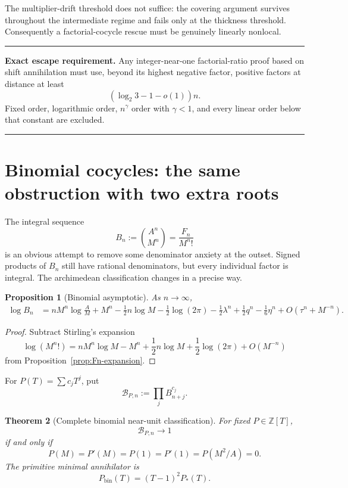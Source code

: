 \documentclass[11pt,oneside]{article}
\newtheorem{theorem}{Theorem}[section]
\newtheorem{proposition}[theorem]{Proposition}
\theoremstyle{definition}
\theoremstyle{remark}
\newcommand{\Z}{\mathbb Z}
\newcommand{\cB}{\mathcal B}
\newenvironment{resultbox}
{\begin{center}\begin{minipage}{0.94\textwidth}\hrule\vspace{0.45em}}
{\vspace{0.35em}\hrule\end{minipage}\end{center}}
\begin{document}
The multiplier-drift threshold does not suffice: the covering argument survives throughout
the intermediate regime and fails only at the thickness threshold.  Consequently a
factorial-cocycle rescue must be genuinely linearly nonlocal.

\begin{resultbox}
\textbf{Exact escape requirement.}
Any integer-near-one factorial-ratio proof based on shift annihilation must use, beyond its
highest negative factor, positive factors at distance at least
\[
 (\log_2 3-1-o(1))n.
\]
Fixed order, logarithmic order, $n^\gamma$ order with $\gamma<1$, and every linear order below
that constant are excluded.
\end{resultbox}

\section{Binomial cocycles: the same obstruction with two extra roots}
\label{sec:binomial}

The integral sequence
\begin{equation}
 B_n:=\binom{A^n}{M^n}=\frac{F_n}{M^n!}
 \label{eq:Bn}
\end{equation}
is an obvious attempt to remove some denominator anxiety at the outset.  Signed products of
$B_n$ still have rational denominators, but every individual factor is integral.  The
archimedean classification changes in a precise way.

\begin{proposition}[Binomial asymptotic]
\label{prop:binomial-asymptotic}
As $n\to\infty$,
\begin{align}
 \log B_n
 &=nM^n\log\frac AM+M^n
   -\frac12n\log M-\frac12\log(2\pi)
   -\frac12\lambda^n+\frac12q^n
   -\frac16\eta^n
   +O(\tau^n+M^{-n}).
 \label{eq:binomial-asymptotic}
\end{align}
\end{proposition}

\begin{proof}
Subtract Stirling's expansion
\[
 \log(M^n!)=nM^n\log M-M^n+\frac12n\log M+\frac12\log(2\pi)+O(M^{-n})
\]
from Proposition~\ref{prop:Fn-expansion}.
\end{proof}

For $P(T)=\sum c_jT^j$, put
\begin{equation}
 \cB_{P,n}:=\prod_jB_{n+j}^{c_j}.
 \label{eq:binomial-cocycle}
\end{equation}

\begin{theorem}[Complete binomial near-unit classification]
\label{thm:binomial-classification}
For fixed $P\in\Z[T]$,
\begin{equation}
 \cB_{P,n}\longrightarrow1
 \label{eq:binomial-nearunit}
\end{equation}
if and only if
\begin{equation}
 P(M)=P'(M)=P(1)=P'(1)=P(M^2/A)=0.
 \label{eq:binomial-roots}
\end{equation}
The primitive minimal annihilator is
\begin{equation}
 P_{\mathrm{bin}}(T)=(T-1)^2P_*(T).
 \label{eq:Pbin}
\end{equation}
\end{theorem}
\end{document}
